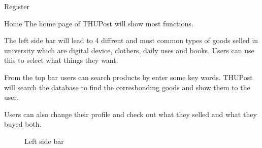 \documentclass[final]{beamer}
\newlength{\onecolwid}
\begin{document}
\begin{frame}[t]
\begin{columns}[t]
\begin{column}{\onecolwid}
\begin{block}{Register}
\end{block}
\begin{block}{Home}
The home page of THUPost will show most functions. 

The left side bar will lead to 4 diffrent and most common types of goods selled in university which are digital device, clothers, daily uses and books. Users can use this to select what things they want.

From the top bar users can search products by enter some key words. THUPost will search the database to find the corresbonding goods and show them to the user.

Users can also change their profile and check out what they selled and what they buyed both.



\begin{figure}
\caption{Left side bar}
\end{figure}






\end{block}




\end{column}
\end{columns}
\end{frame}
\end{document}
